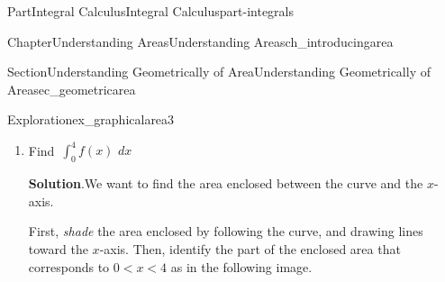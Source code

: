 \documentclass[oneside,10pt,]{tufte-book}
\newcommand{\blocktitlefont}{\relax}
\numberwithin{equation}{chapter}
\newcommand{\intdx}[1]{{\,\int#1\,\,dx}}
\newcommand{\lt}{<}
\begin{document}
\begin{partptx}{Part}{Integral Calculus}{}{Integral Calculus}{}{}{part-integrals}
\begin{chapterptx}{Chapter}{Understanding Areas}{}{Understanding Areas}{}{}{ch_introducingarea}
\begin{sectionptx}{Section}{Understanding Geometrically of Area}{}{Understanding Geometrically of Area}{}{}{sec_geometricarea}
\begin{exploration}{Exploration}{}{ex_graphicalarea3}
\begin{enumerate}[font=\bfseries,label=(\alph*),ref=\alph*]
\begin{image}{0.25}{0.5}{0.25}{}
{
}%
\end{image}%
The shaded area is triangle with base \(b=2\) and height \(h=1\). The region enclosed is \emph{above} the \(x\)-axis so it has \emph{positive} net area. Putting this together,%
\begin{equation*}
\intdx{_0^2 f(x) } = (+) \frac{1}{2}\cdot 2 \cdot 1 = 0.5
\end{equation*}
%
\item{}Find \(\intdx{_0^4 f(x) }\)%
\par\smallskip%
\noindent\textbf{\blocktitlefont Solution}.\hypertarget{ex_graphicalarea3-4-2}{}\quad{}We want to find the area enclosed between the curve and the \(x\)-axis.%
\par
First, \emph{shade} the area enclosed by following the curve, and drawing lines toward the \(x\)-axis. Then, identify the part of the enclosed area that corresponds to \(0\lt x \lt 4\) as in the following image.%
\begin{image}{0.25}{0.5}{0.25}{}%
\end{image}
\end{enumerate}
\end{exploration}
\end{sectionptx}
\end{chapterptx}
\end{partptx}
\end{document}
